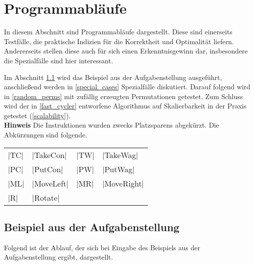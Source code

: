 \clearpage
\section{Programmabläufe}
 In diesem Abschnitt sind Programmabläufe dargestellt. Diese sind einerseits Testfälle, die praktische Indizien für die Korrektheit und Optimalität liefern.
 Andererseits stellen diese auch für sich einen Erkenntnisgewinn dar, insbesondere die Spezialfälle sind hier interessant.

 Im Abschnitt \ref{aufgabenstellung} wird das Beispiel aus der Aufgabenstellung ausgeführt, anschließend werden in \ref{special_cases} Spezialfälle diskutiert.
 Darauf folgend wird in \ref{random_perms} mit zufällig erzeugten Permutationen getestet.
 Zum Schluss wird der in \ref{fast_cycler} entworfene Algorithmus auf Skalierbarkeit in der Praxis getestet (\ref{scalability}).\\
\textbf{Hinweis} Die Instruktionen wurden zwecks Platzsparens abgekürzt. Die Abkürzungen sind folgende.
 \begin{center}
  \begin{tabular}{llll}
   |TC| & |TakeCon| & |TW| & |TakeWag| \\
   |PC| & |PutCon|  & |PW| & |PutWag|   \\
   |ML| & |MoveLeft|& |MR| & |MoveRight| \\
    |R| & |Rotate|  &      &      \\
  \end{tabular}
 \end{center}
\subsection{Beispiel aus der Aufgabenstellung}
\label{aufgabenstellung}
Folgend ist der Ablauf, der sich bei Eingabe des Beispiels aus der Aufgabenstellung ergibt, dargestellt.

